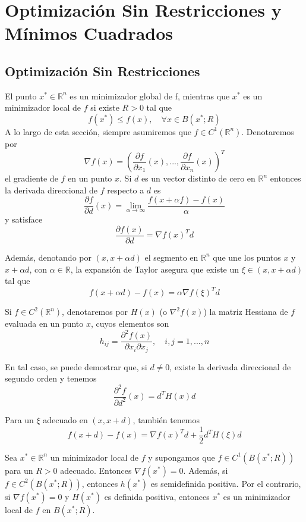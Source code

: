 \chapter{Optimización Sin Restricciones y Mínimos Cuadrados}
\section{Optimización Sin Restricciones}

El punto $x^* \in \mathbb{R}^n$ es un minimizador global de f, mientras que $x^*$ es un minimizador local de $f$ si existe $R > 0$ tal que
\[ f(x^*) \leq f(x), \quad \forall x \in B (x^*; R) \]
A lo largo de esta sección, siempre asumiremos que $f \in C^1(\mathbb{R}^n)$. Denotaremos por
\[ \nabla f(x) = \left( \frac{\partial f}{\partial x_1} (x), ..., \frac{\partial f}{\partial x_n} (x) \right)^T \]
el gradiente de $f$ en un punto $x$. Si $d$ es un vector distinto de cero en $\mathbb{R}^n$ entonces la derivada direccional de $f$ respecto a $d$ es
\[ \frac{\partial f}{\partial d}(x) = \lim_{\alpha \rightarrow \infty} \frac{f(x + \alpha f) - f(x)}{\alpha} \]
y satisface
\[ \frac{\partial f(x)}{\partial d} = \nabla f(x)^T d \]

Además, denotando por $(x, x + \alpha d)$ el segmento en $\mathbb{R}^n$ que une los puntos $x$ y $x + \alpha d$, con $\alpha \in \mathbb{R}$, la expansión de Taylor asegura que existe un $\xi \in (x, x + \alpha d)$ tal que
\begin{equation}
    \label{eq: Quarteroni 7.20}
    f(x + \alpha d) - f(x) = \alpha \nabla f(\xi)^T d
\end{equation}

Si $f \in C^2(\mathbb{R}^n)$, denotaremos por $H(x)$ (o $\nabla^2 f(x)$) la matriz Hessiana de $f$ evaluada en un punto $x$, cuyos elementos son
\[ h_{ij} = \frac{\partial^2 f(x)}{\partial x_i \partial x_j}, \quad i, j = 1, ..., n \]

En tal caso, se puede demostrar que, si $d \neq 0$, existe la derivada direccional de segundo orden y tenemos 
\[ \frac{\partial^2 f}{\partial d^2} (x) = d^T H(x) d \]

Para un $\xi$ adecuado en $(x, x + d)$, también tenemos
\[ f(x + d) - f(x) = \nabla f(x)^T d + \frac{1}{2} d^T H(\xi) d \]

\begin{property}
    Sea $x^* \in \mathbb{R}^n$ un minimizador local de $f$ y supongamos que $f \in C^1(B(x^*; R))$ para un $R > 0$ adecuado. Entonces $\nabla f(x^*) = 0$. Además, si $f \in C^2(B(x^*; R))$, entonces $h(x^*)$ es semidefinida positiva. Por el contrario, si $\nabla f(x^*) = 0$ y $H(x^*)$ es definida positiva, entonces $x^*$ es un minimizador local de $f$ en $B(x^*; R)$.
\end{property}

